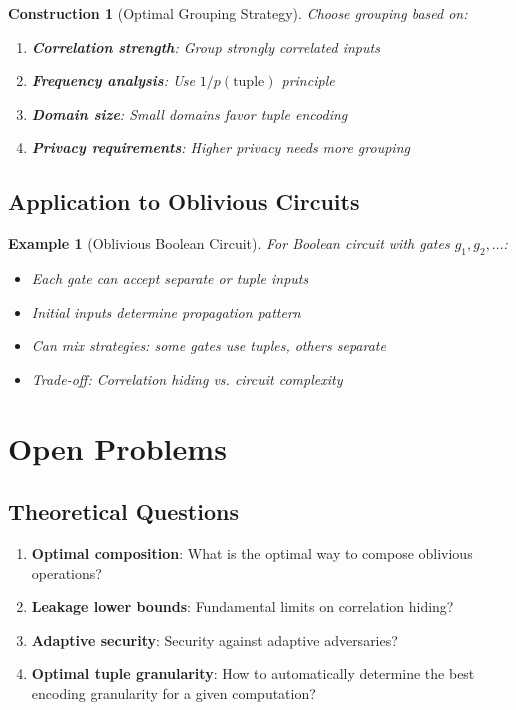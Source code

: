 \documentclass[11pt,final]{article}
\newtheorem{example}[theorem]{Example}
\newtheorem{construction}[theorem]{Construction}
\begin{document}
\begin{construction}[Optimal Grouping Strategy]
Choose grouping based on:
\begin{enumerate}
    \item \textbf{Correlation strength}: Group strongly correlated inputs
    \item \textbf{Frequency analysis}: Use $1/p(\text{tuple})$ principle
    \item \textbf{Domain size}: Small domains favor tuple encoding
    \item \textbf{Privacy requirements}: Higher privacy needs more grouping
\end{enumerate}
\end{construction}

\subsection{Application to Oblivious Circuits}

\begin{example}[Oblivious Boolean Circuit]
For Boolean circuit with gates $g_1, g_2, \ldots$:
\begin{itemize}
    \item Each gate can accept separate or tuple inputs
    \item Initial inputs determine propagation pattern
    \item Can mix strategies: some gates use tuples, others separate
    \item Trade-off: Correlation hiding vs. circuit complexity
\end{itemize}
\end{example}

\section{Open Problems}

\subsection{Theoretical Questions}

\begin{enumerate}
    \item \textbf{Optimal composition}: What is the optimal way to compose oblivious operations?
    \item \textbf{Leakage lower bounds}: Fundamental limits on correlation hiding?
    \item \textbf{Adaptive security}: Security against adaptive adversaries?
    \item \textbf{Optimal tuple granularity}: How to automatically determine the best encoding granularity for a given computation?
\end{enumerate}
\end{document}
